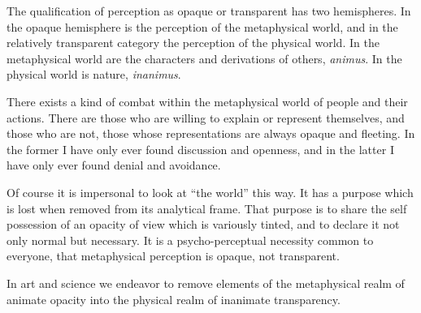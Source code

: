 

The qualification of perception as opaque or transparent has two
hemispheres.  In the opaque hemisphere is the perception of the
metaphysical world, and in the relatively transparent category the
perception of the physical world.  In the metaphysical world are the
characters and derivations of others, {\it animus}.  In the physical
world is nature, {\it inanimus}.

There exists a kind of combat within the metaphysical world of people
and their actions.  There are those who are willing to explain or
represent themselves, and those who are not, those whose
representations are always opaque and fleeting.  In the former I have
only ever found discussion and openness, and in the latter I have only
ever found denial and avoidance.

Of course it is impersonal to look at ``the world'' this way.  It has
a purpose which is lost when removed from its analytical frame.  That
purpose is to share the self possession of an opacity of view which is
variously tinted, and to declare it not only normal but necessary.  It
is a psycho-perceptual necessity common to everyone, that metaphysical
perception is opaque, not transparent.

In art and science we endeavor to remove elements of the metaphysical
realm of animate opacity into the physical realm of inanimate
transparency.

\bye
